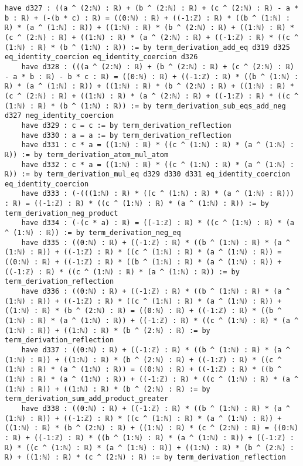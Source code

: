 \documentclass{article}
\begin{document}
\begin{tcolorbox}[colback=white!10, width=\linewidth]
\begin{lstlisting}[language=Lean4]
    have d327 : ((a ^ (2:ℕ) : ℝ) + (b ^ (2:ℕ) : ℝ) + (c ^ (2:ℕ) : ℝ) - a * b : ℝ) + (-(b * c) : ℝ) = ((0:ℕ) : ℝ) + ((-1:ℤ) : ℝ) * ((b ^ (1:ℕ) : ℝ) * (a ^ (1:ℕ) : ℝ)) + ((1:ℕ) : ℝ) * (b ^ (2:ℕ) : ℝ) + ((1:ℕ) : ℝ) * (c ^ (2:ℕ) : ℝ) + ((1:ℕ) : ℝ) * (a ^ (2:ℕ) : ℝ) + ((-1:ℤ) : ℝ) * ((c ^ (1:ℕ) : ℝ) * (b ^ (1:ℕ) : ℝ)) := by term_derivation_add_eq d319 d325 eq_identity_coercion eq_identity_coercion d326
    have d328 : (((a ^ (2:ℕ) : ℝ) + (b ^ (2:ℕ) : ℝ) + (c ^ (2:ℕ) : ℝ) - a * b : ℝ) - b * c : ℝ) = ((0:ℕ) : ℝ) + ((-1:ℤ) : ℝ) * ((b ^ (1:ℕ) : ℝ) * (a ^ (1:ℕ) : ℝ)) + ((1:ℕ) : ℝ) * (b ^ (2:ℕ) : ℝ) + ((1:ℕ) : ℝ) * (c ^ (2:ℕ) : ℝ) + ((1:ℕ) : ℝ) * (a ^ (2:ℕ) : ℝ) + ((-1:ℤ) : ℝ) * ((c ^ (1:ℕ) : ℝ) * (b ^ (1:ℕ) : ℝ)) := by term_derivation_sub_eqs_add_neg d327 neg_identity_coercion
    have d329 : c = c := by term_derivation_reflection
    have d330 : a = a := by term_derivation_reflection
    have d331 : c * a = ((1:ℕ) : ℝ) * ((c ^ (1:ℕ) : ℝ) * (a ^ (1:ℕ) : ℝ)) := by term_derivation_atom_mul_atom
    have d332 : c * a = ((1:ℕ) : ℝ) * ((c ^ (1:ℕ) : ℝ) * (a ^ (1:ℕ) : ℝ)) := by term_derivation_mul_eq d329 d330 d331 eq_identity_coercion eq_identity_coercion
    have d333 : (-(((1:ℕ) : ℝ) * ((c ^ (1:ℕ) : ℝ) * (a ^ (1:ℕ) : ℝ))) : ℝ) = ((-1:ℤ) : ℝ) * ((c ^ (1:ℕ) : ℝ) * (a ^ (1:ℕ) : ℝ)) := by term_derivation_neg_product
    have d334 : (-(c * a) : ℝ) = ((-1:ℤ) : ℝ) * ((c ^ (1:ℕ) : ℝ) * (a ^ (1:ℕ) : ℝ)) := by term_derivation_neg_eq
    have d335 : ((0:ℕ) : ℝ) + ((-1:ℤ) : ℝ) * ((b ^ (1:ℕ) : ℝ) * (a ^ (1:ℕ) : ℝ)) + ((-1:ℤ) : ℝ) * ((c ^ (1:ℕ) : ℝ) * (a ^ (1:ℕ) : ℝ)) = ((0:ℕ) : ℝ) + ((-1:ℤ) : ℝ) * ((b ^ (1:ℕ) : ℝ) * (a ^ (1:ℕ) : ℝ)) + ((-1:ℤ) : ℝ) * ((c ^ (1:ℕ) : ℝ) * (a ^ (1:ℕ) : ℝ)) := by term_derivation_reflection
    have d336 : ((0:ℕ) : ℝ) + ((-1:ℤ) : ℝ) * ((b ^ (1:ℕ) : ℝ) * (a ^ (1:ℕ) : ℝ)) + ((-1:ℤ) : ℝ) * ((c ^ (1:ℕ) : ℝ) * (a ^ (1:ℕ) : ℝ)) + ((1:ℕ) : ℝ) * (b ^ (2:ℕ) : ℝ) = ((0:ℕ) : ℝ) + ((-1:ℤ) : ℝ) * ((b ^ (1:ℕ) : ℝ) * (a ^ (1:ℕ) : ℝ)) + ((-1:ℤ) : ℝ) * ((c ^ (1:ℕ) : ℝ) * (a ^ (1:ℕ) : ℝ)) + ((1:ℕ) : ℝ) * (b ^ (2:ℕ) : ℝ) := by term_derivation_reflection
    have d337 : ((0:ℕ) : ℝ) + ((-1:ℤ) : ℝ) * ((b ^ (1:ℕ) : ℝ) * (a ^ (1:ℕ) : ℝ)) + ((1:ℕ) : ℝ) * (b ^ (2:ℕ) : ℝ) + ((-1:ℤ) : ℝ) * ((c ^ (1:ℕ) : ℝ) * (a ^ (1:ℕ) : ℝ)) = ((0:ℕ) : ℝ) + ((-1:ℤ) : ℝ) * ((b ^ (1:ℕ) : ℝ) * (a ^ (1:ℕ) : ℝ)) + ((-1:ℤ) : ℝ) * ((c ^ (1:ℕ) : ℝ) * (a ^ (1:ℕ) : ℝ)) + ((1:ℕ) : ℝ) * (b ^ (2:ℕ) : ℝ) := by term_derivation_sum_add_product_greater
    have d338 : ((0:ℕ) : ℝ) + ((-1:ℤ) : ℝ) * ((b ^ (1:ℕ) : ℝ) * (a ^ (1:ℕ) : ℝ)) + ((-1:ℤ) : ℝ) * ((c ^ (1:ℕ) : ℝ) * (a ^ (1:ℕ) : ℝ)) + ((1:ℕ) : ℝ) * (b ^ (2:ℕ) : ℝ) + ((1:ℕ) : ℝ) * (c ^ (2:ℕ) : ℝ) = ((0:ℕ) : ℝ) + ((-1:ℤ) : ℝ) * ((b ^ (1:ℕ) : ℝ) * (a ^ (1:ℕ) : ℝ)) + ((-1:ℤ) : ℝ) * ((c ^ (1:ℕ) : ℝ) * (a ^ (1:ℕ) : ℝ)) + ((1:ℕ) : ℝ) * (b ^ (2:ℕ) : ℝ) + ((1:ℕ) : ℝ) * (c ^ (2:ℕ) : ℝ) := by term_derivation_reflection

\end{lstlisting}
\end{tcolorbox}
\end{document}

